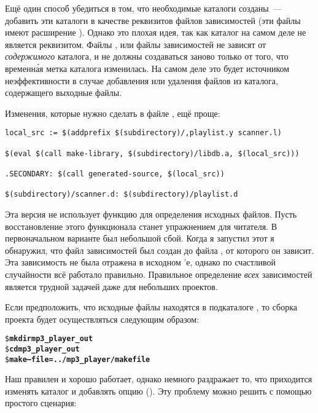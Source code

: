 Ещё один способ убедиться в том, что необходимые каталоги созданы~---
добавить эти каталоги в качестве реквизитов файлов зависимостей (эти
файлы имеют расширение ). Однако это плохая идея, так как
каталог на самом деле не является реквизитом. Файлы ,
 или файлы зависимостей не зависят от \emph{содержимого}
каталога, и не должны создаваться заново только от того, что
временн\'{а}я метка каталога изменилась. На самом деле это будет
источником неэффективности в случае добавления или удаления файлов из
каталога, содержащего выходные файлы.

Изменения, которые нужно сделать в файле , ещё
проще:

{\footnotesize
\begin{verbatim}
local_src := $(addprefix $(subdirectory)/,playlist.y scanner.l)

$(eval $(call make-library, $(subdirectory)/libdb.a, $(local_src)))

.SECONDARY: $(call generated-source, $(local_src))

$(subdirectory)/scanner.d: $(subdirectory)/playlist.d
\end{verbatim}
}

Эта версия не использует функцию  для определения
исходных файлов. Пусть восстановление этого функционала станет
упражнением для читателя. В первоначальном варианте был небольшой
сбой. Когда я запустил этот \Makefile{} я обнаружил, что файл
зависимостей  был создан до файла
, от которого он зависит. Эта зависимость не была
отражена в исходном \Makefile{}'е, однако по счастливой случайности
всё работало правильно. Правильное определение \emph{всех}
зависимостей является трудной задачей даже для небольших проектов.

Если предположить, что исходные файлы находятся в подкаталоге
, то сборка проекта будет осуществляться
следующим образом:

{\footnotesize
\begin{alltt}
\$ \textbf{mkdir mp3\_player\_out}
\$ \textbf{cd mp3\_player\_out}
\$ \textbf{make --file=../mp3\_player/makefile}
\end{alltt}
}

Наш \Makefile{} правилен и хорошо работает, однако немного раздражает
то, что приходится изменять каталог и добавлять опцию
 (). Эту проблему можно решить с помощью
простого сценария:

